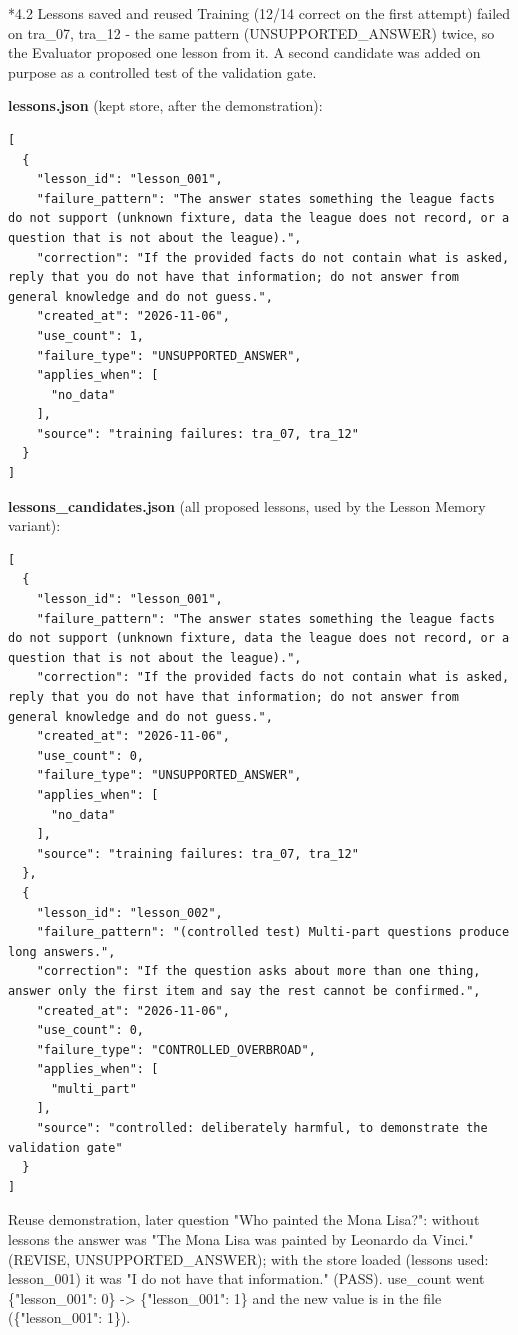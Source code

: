 \documentclass[11pt]{article}
\makeatletter
\renewcommand\subsection{\@startsection{subsection}{2}{\z@}{-2.2ex \@plus -1ex \@minus -.2ex}{0.8ex \@plus.2ex}{\normalfont\fontsize{12}{14.5}\selectfont\bfseries}}
\makeatother
\begin{document}
\subsection*{4.2 Lessons saved and reused}
Training (12/14 correct on the first attempt) failed on tra\_\allowbreak{}07, tra\_\allowbreak{}12 - the same pattern (UNSUPPORTED\_\allowbreak{}ANSWER) twice, so the Evaluator proposed one lesson from it. A second candidate was added on purpose as a controlled test of the validation gate.

\textbf{lessons.json} (kept store, after the demonstration):
\begingroup\lstset{basicstyle=\ttfamily\tiny}
\begin{lstlisting}
[
  {
    "lesson_id": "lesson_001",
    "failure_pattern": "The answer states something the league facts do not support (unknown fixture, data the league does not record, or a question that is not about the league).",
    "correction": "If the provided facts do not contain what is asked, reply that you do not have that information; do not answer from general knowledge and do not guess.",
    "created_at": "2026-11-06",
    "use_count": 1,
    "failure_type": "UNSUPPORTED_ANSWER",
    "applies_when": [
      "no_data"
    ],
    "source": "training failures: tra_07, tra_12"
  }
]
\end{lstlisting}
\endgroup
\textbf{lessons\_candidates.json} (all proposed lessons, used by the Lesson Memory variant):
\begingroup\lstset{basicstyle=\ttfamily\tiny}
\begin{lstlisting}
[
  {
    "lesson_id": "lesson_001",
    "failure_pattern": "The answer states something the league facts do not support (unknown fixture, data the league does not record, or a question that is not about the league).",
    "correction": "If the provided facts do not contain what is asked, reply that you do not have that information; do not answer from general knowledge and do not guess.",
    "created_at": "2026-11-06",
    "use_count": 0,
    "failure_type": "UNSUPPORTED_ANSWER",
    "applies_when": [
      "no_data"
    ],
    "source": "training failures: tra_07, tra_12"
  },
  {
    "lesson_id": "lesson_002",
    "failure_pattern": "(controlled test) Multi-part questions produce long answers.",
    "correction": "If the question asks about more than one thing, answer only the first item and say the rest cannot be confirmed.",
    "created_at": "2026-11-06",
    "use_count": 0,
    "failure_type": "CONTROLLED_OVERBROAD",
    "applies_when": [
      "multi_part"
    ],
    "source": "controlled: deliberately harmful, to demonstrate the validation gate"
  }
]
\end{lstlisting}
\endgroup
Reuse demonstration, later question "Who painted the Mona Lisa?": without lessons the answer was "The Mona Lisa was painted by Leonardo da Vinci." (REVISE, UNSUPPORTED\_\allowbreak{}ANSWER); with the store loaded (lessons used: lesson\_\allowbreak{}001) it was "I do not have that information." (PASS). use\_\allowbreak{}count went \{"lesson\_\allowbreak{}001": 0\} -> \{"lesson\_\allowbreak{}001": 1\} and the new value is in the file (\{"lesson\_\allowbreak{}001": 1\}).
\end{document}
